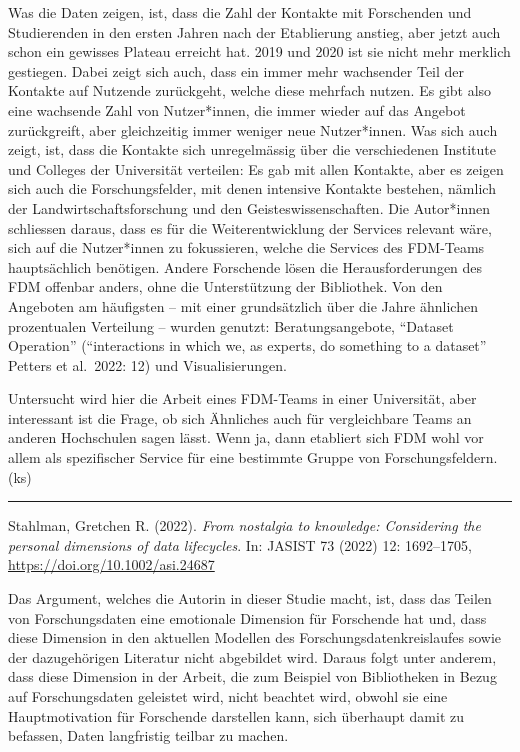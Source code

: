 \documentclass[a4paper,
fontsize=11pt,
oneside,
numbers=noperiodatend,
parskip=half-,
bibliography=totoc,
final
]{scrartcl}
\begin{document}
Was die Daten zeigen, ist, dass die Zahl der Kontakte mit Forschenden
und Studierenden in den ersten Jahren nach der Etablierung anstieg, aber
jetzt auch schon ein gewisses Plateau erreicht hat. 2019 und 2020 ist
sie nicht mehr merklich gestiegen. Dabei zeigt sich auch, dass ein immer
mehr wachsender Teil der Kontakte auf Nutzende zurückgeht, welche diese
mehrfach nutzen. Es gibt also eine wachsende Zahl von Nutzer*innen, die
immer wieder auf das Angebot zurückgreift, aber gleichzeitig immer
weniger neue Nutzer*innen. Was sich auch zeigt, ist, dass die Kontakte
sich unregelmässig über die verschiedenen Institute und Colleges der
Universität verteilen: Es gab mit allen Kontakte, aber es zeigen sich
auch die Forschungsfelder, mit denen intensive Kontakte bestehen,
nämlich der Landwirtschaftsforschung und den Geisteswissenschaften. Die
Autor*innen schliessen daraus, dass es für die Weiterentwicklung der
Services relevant wäre, sich auf die Nutzer*innen zu fokussieren, welche
die Services des FDM-Teams hauptsächlich benötigen. Andere Forschende
lösen die Herausforderungen des FDM offenbar anders, ohne die
Unterstützung der Bibliothek. Von den Angeboten am häufigsten -- mit
einer grundsätzlich über die Jahre ähnlichen prozentualen Verteilung --
wurden genutzt: Beratungsangebote, \enquote{Dataset Operation}
(\enquote{interactions in which we, as experts, do something to a
dataset} Petters et al.~2022: 12) und Visualisierungen.

Untersucht wird hier die Arbeit eines FDM-Teams in einer Universität,
aber interessant ist die Frage, ob sich Ähnliches auch für vergleichbare
Teams an anderen Hochschulen sagen lässt. Wenn ja, dann etabliert sich
FDM wohl vor allem als spezifischer Service für eine bestimmte Gruppe
von Forschungsfeldern. (ks)

\begin{center}\rule{0.5\linewidth}{0.5pt}\end{center}
\pagebreak

Stahlman, Gretchen R. (2022). \emph{From nostalgia to knowledge:
Considering the personal dimensions of data lifecycles}. In: JASIST 73
(2022) 12: 1692--1705, \url{https://doi.org/10.1002/asi.24687}

Das Argument, welches die Autorin in dieser Studie macht, ist, dass das
Teilen von Forschungsdaten eine emotionale Dimension für Forschende hat
und, dass diese Dimension in den aktuellen Modellen des
Forschungsdatenkreislaufes sowie der dazugehörigen Literatur nicht
abgebildet wird. Daraus folgt unter anderem, dass diese Dimension in der
Arbeit, die zum Beispiel von Bibliotheken in Bezug auf Forschungsdaten
geleistet wird, nicht beachtet wird, obwohl sie eine Hauptmotivation für
Forschende darstellen kann, sich überhaupt damit zu befassen, Daten
langfristig teilbar zu machen.
\end{document}
